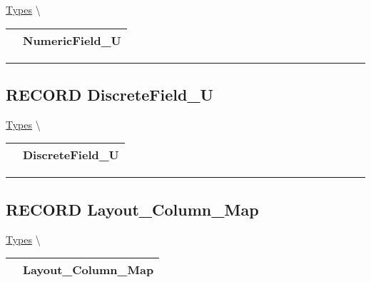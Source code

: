 \hypertarget{ecldoc:logisticregression.types.numericfield_u}{}
\hspace{0pt} \hyperlink{ecldoc:LogisticRegression.Types}{Types} \textbackslash 

{\renewcommand{\arraystretch}{1.5}
\begin{tabularx}{\textwidth}{|>{\raggedright\arraybackslash}l|X|}
\hline
\hspace{0pt}\mytexttt{\color{red} } & \textbf{NumericField\_U} \\
\hline
\end{tabularx}
}

\par


\rule{\linewidth}{0.5pt}
\subsection*{\textsf{\colorbox{headtoc}{\color{white} RECORD}
DiscreteField\_U}}

\hypertarget{ecldoc:logisticregression.types.discretefield_u}{}
\hspace{0pt} \hyperlink{ecldoc:LogisticRegression.Types}{Types} \textbackslash 

{\renewcommand{\arraystretch}{1.5}
\begin{tabularx}{\textwidth}{|>{\raggedright\arraybackslash}l|X|}
\hline
\hspace{0pt}\mytexttt{\color{red} } & \textbf{DiscreteField\_U} \\
\hline
\end{tabularx}
}

\par


\rule{\linewidth}{0.5pt}
\subsection*{\textsf{\colorbox{headtoc}{\color{white} RECORD}
Layout\_Column\_Map}}

\hypertarget{ecldoc:logisticregression.types.layout_column_map}{}
\hspace{0pt} \hyperlink{ecldoc:LogisticRegression.Types}{Types} \textbackslash 

{\renewcommand{\arraystretch}{1.5}
\begin{tabularx}{\textwidth}{|>{\raggedright\arraybackslash}l|X|}
\hline
\hspace{0pt}\mytexttt{\color{red} } & \textbf{Layout\_Column\_Map} \\
\hline
\end{tabularx}
}

